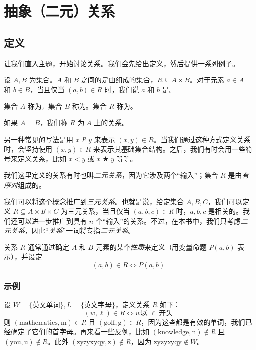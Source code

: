 \section{抽象（二元）关系}

\subsection{定义}

让我们直入主题，开始讨论关系。我们会先给出定义，然后提供一系列例子。

\begin{definition}
    设 $A, B$ 为集合。$A$ 和 $B$ 之间的是由组成的集合，$R \subseteq A \times B$。对于元素 $a \in A$ 和 $b \in B$，当且仅当 $(a, b) \in R$ 时，我们说 $a$ 和 $b$ 是。

    集合 $A$ 称为，集合 $B$ 称为。集合 $R$ 称为。
    
    如果 $A = B$，我们称 $R$ 为 $A$ 上的关系。
\end{definition}

另一种常见的写法是用 $x \;R\; y$ 来表示 $(x,y) \in R$。当我们通过这种方式定义关系时，会坚持使用 $(x, y) \in R$ 来表示其基础集合结构。之后，我们有时会用一些符号来定义关系，比如 $x < y$ 或 $x \;\bigstar\; y$ 等等。

\begin{remark}
    我们这里定义的关系有时也叫\emph{二元关系}，因为它涉及两个``输入''；集合 $R$ 是由\emph{有序对}组成的。

    我们可以将这个概念推广到\emph{三元关系}。也就是说，给定集合 $A,B,C$，我们可以定义 $R \subseteq A \times B \times C$ 为三元关系，当且仅当 $(a, b, c) \in R$ 时，$a,b,c$ 是相关的。我们还可以进一步推广到具有 $n$ 个``输入''的关系。不过，在本书中，我们只考虑\emph{二元关系}，因此``\emph{关系}''一词将专指\emph{二元关系}。
\end{remark}

\begin{remark}
    关系 $R$ 通常通过确定 $A$ 和 $B$ 元素的某个\emph{性质}来定义（用变量命题 $P(a,b)$ 表示），并设定
    \[(a,b) \in R \iff P(a,b)\]
\end{remark}

\subsubsection*{示例}

\begin{example}
    设 $W=\{\text{英文单词}\}, L=\{\text{英文字母}\}$，定义关系 $R$ 如下：
    \[(w, \ell) \in R \iff w \text{以 } \ell \text{ 开头}\]
    则 $(\text{mathematics},\text{m}) \in R$ 且 $(\text{golf},\text{g}) \in R$，因为这些都是有效的单词，我们已经确定了它们的首字母。再来看一些反例，比如 $(\text{knowledge},\text{n}) \notin R$ 且 $(\text{you},\text{u}) \notin R$。此外 $(\text{zyzyxyqy},\text{z}) \notin R$，因为 $\text{zyzyxyqy} \notin W$。
\end{example}

